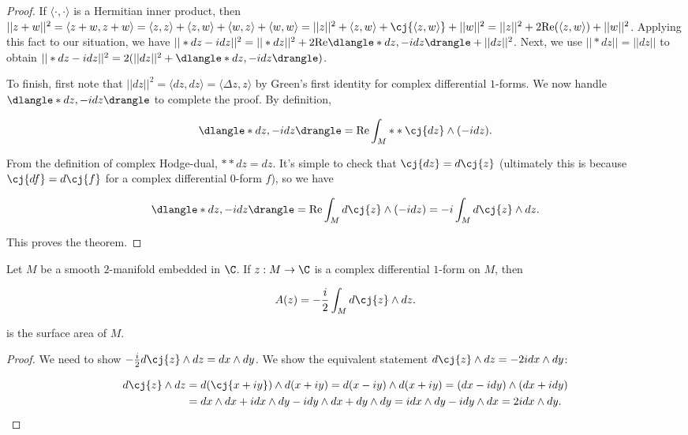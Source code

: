 \begin{proof}
    If $\langle \cdot, \cdot \rangle$ is a Hermitian inner product, then $||z + w||^2 = \langle z + w, z + w \rangle = \langle z, z \rangle + \langle z, w \rangle + \langle w, z \rangle + \langle w, w \rangle = ||z||^2 + \langle z, w \rangle + \cj{\langle z, w \rangle} + ||w||^2 = ||z||^2 + 2\text{Re}(\langle z, w \rangle) + ||w||^2$. Applying this fact to our situation, we have $||*dz - idz||^2 = ||*dz||^2 + 2\text{Re} \dlangle *dz, -idz \drangle + ||dz||^2$. Next, we use $||*dz|| = ||dz||$ to obtain $||*dz - idz||^2 = 2(||dz||^2 + \dlangle *dz, -i dz \drangle)$. 
    
    To finish, first note that $||dz||^2 = \langle dz, dz \rangle = \langle \Delta z, z \rangle$ by Green's first identity for complex differential $1$-forms. We now handle $\dlangle *dz, -i dz \drangle$ to complete the proof. By definition, 
    
    \begin{align*}
        \dlangle *dz, -i dz \drangle = \text{Re} \int_M **\cj{dz} \wedge (- i dz).
    \end{align*}
    
    From the definition of complex Hodge-dual, $**dz = dz$. It's simple to check that $\cj{dz} = d\cj{z}$ (ultimately this is because $\cj{df} = d\cj{f}$ for a complex differential $0$-form $f$), so we have
    
    \begin{align*}
        \dlangle *dz, -i dz \drangle = \text{Re} \int_M d\cj{z} \wedge (- i dz) = -i \int_M d\cj{z} \wedge dz.
    \end{align*}
    
    This proves the theorem.
\end{proof}

\begin{lemma}
    Let $M$ be a smooth $2$-manifold embedded in $\C$. If $z:M \rightarrow \C$ is a complex differential $1$-form on $M$, then
    
    \begin{align*}
        A(z) = -\frac{i}{2} \int_M d \cj{z} \wedge dz.
    \end{align*}
    
    is the surface area of $M$.
\end{lemma}

\begin{proof}
    We need to show $-\frac{i}{2} d\cj{z} \wedge dz = dx \wedge dy$. We show the equivalent statement $d\cj{z} \wedge dz = -2i dx \wedge dy$:
    
     \begin{align*}
        d\cj{z} \wedge dz &= d(\cj{x + iy}) \wedge d(x + iy) = d(x - iy) \wedge d(x + iy) = (dx - idy) \wedge (dx + idy) \\
        &= dx \wedge dx + i  dx \wedge dy - i  dy \wedge dx + dy \wedge dy = i  dx \wedge dy - i  dy \wedge dx = 2i  dx \wedge dy.
    \end{align*}
\end{proof}

